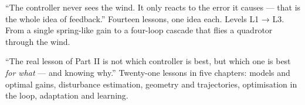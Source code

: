 \documentclass[11pt,oneside,openany]{book}
\begin{document}
\frontmatter




\mainmatter



  {“The controller never sees the wind. It only reacts to the error it causes — that is the whole idea of feedback.”}
  {Fourteen lessons, one idea each. Levels L1 → L3. From a single spring-like gain to a four-loop cascade that flies a quadrotor through the wind.}















  {“The real lesson of Part II is not which controller is best, but which one is best \emph{for what} — and knowing why.”}
  {Twenty-one lessons in five chapters: models and optimal gains, disturbance estimation, geometry and trajectories, optimisation in the loop, adaptation and learning.}






\closeanswers
\appendix








\end{document}
